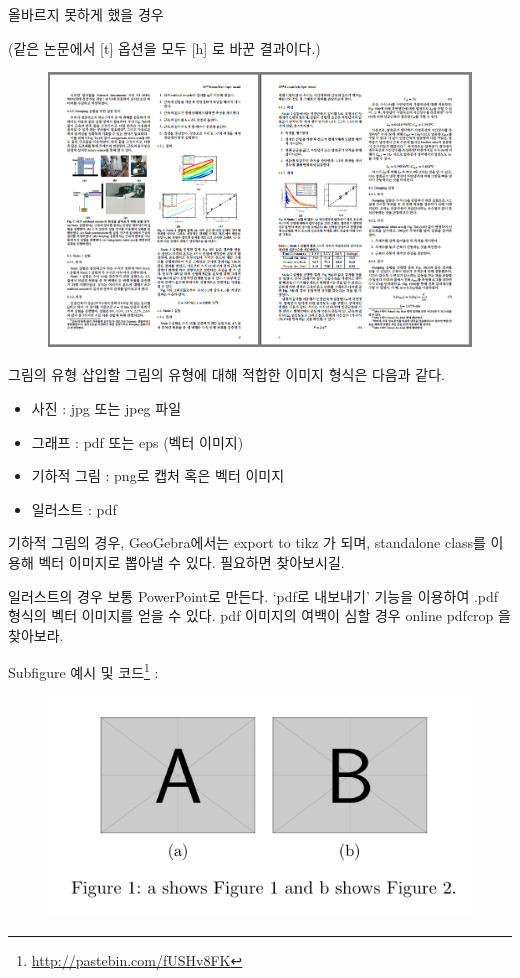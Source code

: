 \documentclass[12pt]{beamer}
\begin{document}
\begin{frame}{올바르지 못하게 했을 경우}
	
	{\small (같은 논문에서 [t] 옵션을 모두 [h] 로 바꾼 결과이다.)}
	\begin{figure}[h]
		\centering
		\includegraphics[width=.9\textwidth]{wrong_fig_v2.png}
	\end{figure}
\end{frame}
\begin{frame}{그림의 유형}
	삽입할 그림의 유형에 대해 적합한 이미지 형식은 다음과 같다.
	\begin{itemize}
		\item 사진 : jpg 또는 jpeg 파일
		\item 그래프 : pdf 또는 eps (벡터 이미지)
		\item 기하적 그림 : png로 캡처 혹은 벡터 이미지
		\item 일러스트 : pdf
	\end{itemize}
	\begin{footnotesize}
		기하적 그림의 경우, GeoGebra에서는 export to tikz 가 되며, standalone class를 이용해 벡터 이미지로 뽑아낼 수 있다. 필요하면 찾아보시길.
		
		일러스트의 경우 보통 PowerPoint로 만든다. `pdf로 내보내기' 기능을 이용하여 .pdf 형식의 벡터 이미지를 얻을 수 있다.
		pdf 이미지의 여백이 심할 경우 online pdfcrop 을 찾아보라.
	\end{footnotesize}
\end{frame}
\begin{frame}[fragile]{Subfigure}
	예시 및 코드\footnote{\url{http://pastebin.com/fUSHv8FK}} : 
	\begin{figure}
		\centering
		\includegraphics[width=.8\textwidth]{subfigure.pdf}
	\end{figure}
\end{frame}
\end{document}
